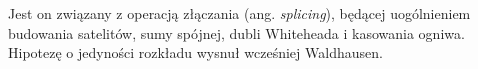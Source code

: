 Jest on związany z operacją złączania (ang. \emph{splicing}), będącej uogólnieniem budowania satelitów, sumy spójnej, dubli Whiteheada i kasowania ogniwa.
%
Hipotezę o jedyności rozkładu wysnuł wcześniej Waldhausen.
%


